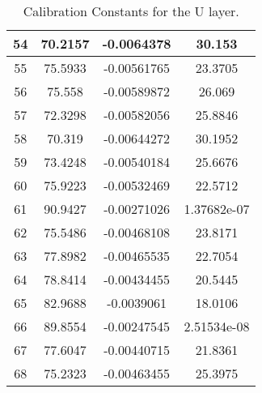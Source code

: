 \begin{table}[h]
{\begin{tabular}{|c|c|c|c|}
54 & 70.2157 & -0.0064378 & 30.153 \\ \hline 
55 & 75.5933 & -0.00561765 & 23.3705 \\ \hline 
56 & 75.558 & -0.00589872 & 26.069 \\ \hline 
57 & 72.3298 & -0.00582056 & 25.8846 \\ \hline 
58 & 70.319 & -0.00644272 & 30.1952 \\ \hline 
59 & 73.4248 & -0.00540184 & 25.6676 \\ \hline 
60 & 75.9223 & -0.00532469 & 22.5712 \\ \hline 
61 & 90.9427 & -0.00271026 & 1.37682e-07 \\ \hline 
62 & 75.5486 & -0.00468108 & 23.8171 \\ \hline 
63 & 77.8982 & -0.00465535 & 22.7054 \\ \hline 
64 & 78.8414 & -0.00434455 & 20.5445 \\ \hline 
65 & 82.9688 & -0.0039061 & 18.0106 \\ \hline 
66 & 89.8554 & -0.00247545 & 2.51534e-08 \\ \hline 
67 & 77.6047 & -0.00440715 & 21.8361 \\ \hline 
68 & 75.2323 & -0.00463455 & 25.3975 \\ \hline  
        \end{tabular}
        }
        \caption{Calibration Constants for the U layer.}
        \label{tab:UattenCSimulation}
\end{table}

